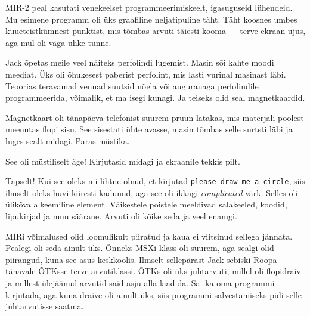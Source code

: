 MIR-2 peal kasutati venekeelset programmeerimiskeelt, igasuguseid
lühendeid. Mu esimene programm oli üks graafiline neljatipuline täht. Täht
koosnes umbes kuueteistkümnest punktist, mis 
tõmbas arvuti täiesti kooma --- terve ekraan ujus, aga mul oli väga uhke tunne. 

Jack õpetas meile veel näiteks 
perfolindi lugemist. Masin sõi kahte moodi meediat. Üks oli õhukesest paberist 
perfolint, mis lasti vurinal masinast läbi. Teoorias teravamad vennad 
suutsid nõela või augurauaga perfolindile programmeerida, võimalik, et ma isegi 
kunagi. Ja teiseks olid seal magnetkaardid. 


Magnetkaart oli tänapäeva telefonist suurem pruun latakas, mis materjali 
poolest meenutas flopi sisu. See sisestati ühte
avasse, masin tõmbas selle 
surtsti läbi ja luges sealt midagi. Paras müstika. 


See oli müstiliselt äge! Kirjutasid midagi ja ekraanile 
tekkis pilt.


Täpselt! Kui see oleks nii lihtne olnud, et kirjutad \verb|please draw me a circle|, 
siis ilmselt oleks huvi kiiresti kadunud, aga see oli ikkagi \emph{complicated} 
värk. 
Selles oli ülikõva alkeemiline element. Väikestele poistele 
meeldivad salakeeled, koodid, lipukirjad ja muu säärane. Arvuti
oli kõike seda ja veel enamgi.

MIRi võimalused olid loomulikult piiratud ja kaua ei viitsinud sellega
jännata. Pealegi oli seda ainult üks. Õnneks MSXi klass oli
suurem, aga sealgi olid piirangud, kuna see asus 
keskkoolis. Ilmselt sellepärast Jack sebiski 
Roopa tänavale ÕTKsse terve arvutiklassi. ÕTKs oli üks
juhtarvuti, millel oli flopidraiv ja millest ülejäänud arvutid said 
asju alla laadida. Sai ka oma programmi kirjutada, aga kuna 
draive oli ainult üks, siis programmi salvestamiseks pidi selle 
juhtarvutisse saatma. 

